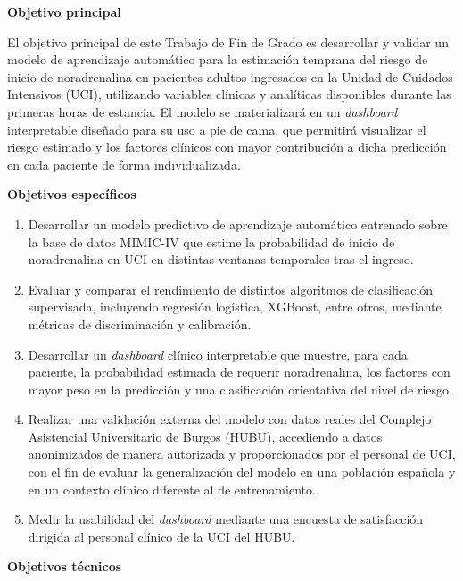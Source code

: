 
\textbf{Objetivo principal}

El objetivo principal de este Trabajo de Fin de Grado es desarrollar y validar un modelo de aprendizaje automático para la estimación temprana del riesgo de inicio de noradrenalina en pacientes adultos ingresados en la Unidad de Cuidados Intensivos (UCI), utilizando variables clínicas y analíticas disponibles durante las primeras horas de estancia. El modelo se materializará en un \textit{dashboard} interpretable diseñado para su uso a pie de cama, que permitirá visualizar el riesgo estimado y los factores clínicos con mayor contribución a dicha predicción en cada paciente de forma individualizada.

\textbf{Objetivos específicos}

\begin{enumerate}
  \item Desarrollar un modelo predictivo de aprendizaje automático entrenado sobre la base de datos MIMIC-IV que estime la probabilidad de inicio de noradrenalina en UCI en distintas ventanas temporales tras el ingreso.

  \item Evaluar y comparar el rendimiento de distintos algoritmos de clasificación supervisada, incluyendo regresión logística, XGBoost, entre otros, mediante métricas de discriminación y calibración.

  \item Desarrollar un \textit{dashboard} clínico interpretable que muestre, para cada paciente, la probabilidad estimada de requerir noradrenalina, los factores con mayor peso en la predicción y una clasificación orientativa del nivel de riesgo.

  \item Realizar una validación externa del modelo con datos reales del Complejo Asistencial Universitario de Burgos (HUBU), accediendo a datos anonimizados de manera autorizada y proporcionados por el personal de UCI, con el fin de evaluar la generalización del modelo en una población española y en un contexto clínico diferente al de entrenamiento.

  \item Medir la usabilidad del \textit{dashboard} mediante una encuesta de satisfacción dirigida al personal clínico de la UCI del HUBU.
\end{enumerate}

\textbf{Objetivos técnicos}

